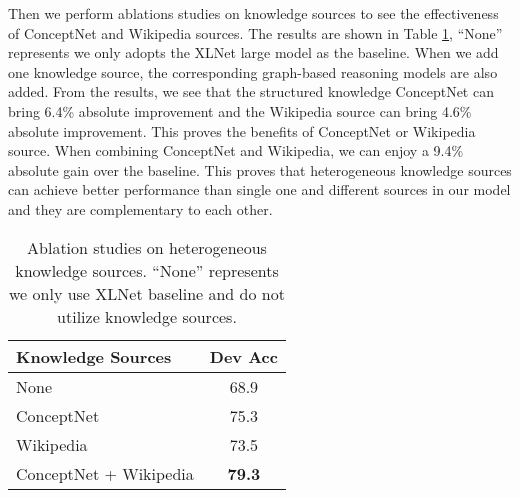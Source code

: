 \documentclass[letterpaper]{article} \usepackage{aaai20}  \usepackage{times}  \usepackage{helvet} \usepackage{courier}  \usepackage[hyphens]{url}  \usepackage{graphicx} \urlstyle{rm} \def\UrlFont{\rm}  \usepackage{graphicx}  \frenchspacing  \setlength{\pdfpagewidth}{8.5in}  \setlength{\pdfpageheight}{11in}
\begin{document}
 \begin{table}[h]
     \centering
     \caption{Ablation studies on reasoning components in our model. E denotes evidence.}
     \label{table:model_ablation}
 \end{table}



 Then we perform ablations studies on knowledge sources to see the effectiveness of ConceptNet and Wikipedia sources. The results are shown in Table \ref{table:source_ablation}, ``None'' represents we only adopts the XLNet \cite{xlnet2019yang} large model as the baseline. When we add one knowledge source, the corresponding graph-based reasoning models are also added. From the results, we see that the structured knowledge ConceptNet can bring 6.4\% absolute improvement and the Wikipedia source can bring 4.6\% absolute improvement. This proves the benefits of ConceptNet or Wikipedia source. When combining ConceptNet and Wikipedia, we can enjoy a 9.4\% absolute gain over the baseline. This proves that heterogeneous knowledge sources can achieve better performance than single one and different sources in our model and they are complementary to each other. 
\begin{table}[h]
    \centering
    \begin{tabular}{l|c}
    \toprule
    Knowledge Sources   & Dev Acc \\
    \midrule
      None   &  68.9 \\
      ConceptNet & 75.3 \\
      Wikipedia & 73.5 \\
      ConceptNet + Wikipedia & \textbf{79.3}\\
    \bottomrule
    \end{tabular}
    \caption{Ablation studies on heterogeneous knowledge sources. ``None'' represents we only use XLNet baseline and do not utilize knowledge sources.}
    \label{table:source_ablation}
\end{table}
\end{document}
